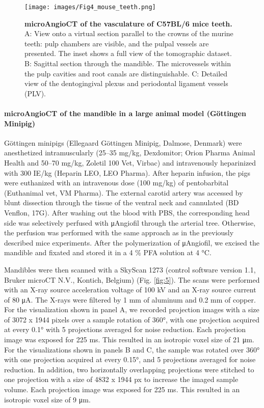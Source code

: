 \begin{figure}
\hypertarget{fig:4}{%
\centering
\texttt{[image: images/Fig4\_mouse\_teeth.png]}
\caption{\textbf{microAngioCT of the vasculature of C57BL/6 mice teeth.}
A: View onto a virtual section parallel to the crowns of the murine teeth: pulp chambers are visible, and the pulpal vessels are presented.
The inset shows a full view of the tomographic dataset.
B: Sagittal section through the mandible.
The microvessels within the pulp cavities and root canals are distinguishable.
C: Detailed view of the dentogingival plexus and periodontal ligament vessels (PLV).}\label{fig:4}
}
\end{figure}

\hypertarget{microangioct-of-the-mandible-in-a-large-animal-model-guxf6ttingen-minipig}{%
\paragraph{microAngioCT of the mandible in a large animal model (Göttingen Minipig)}\label{microangioct-of-the-mandible-in-a-large-animal-model-guxf6ttingen-minipig}}

Göttingen minipigs (Ellegaard Göttingen Minipig, Dalmose, Denmark) were anesthetized intramuscularly (25--35 mg/kg, Dexdomitor; Orion Pharma Animal Health and 50--70 mg/kg, Zoletil 100 Vet, Virbac) and intravenously heparinized with 300 IE/kg (Heparin LEO, LEO Pharma).
After heparin infusion, the pigs were euthanized with an intravenous dose (100 mg/kg) of pentobarbital (Euthanimal vet, VM Pharma).
The external carotid artery was accessed by blunt dissection through the tissue of the ventral neck and cannulated (BD Venflon, 17G).
After washing out the blood with PBS, the corresponding head side was selectively perfused with μAngiofil through the arterial tree.
Otherwise, the perfusion was performed with the same approach as in the previously described mice experiments.
After the polymerization of μAngiofil, we excised the mandible and fixated and stored it in a 4 \% PFA solution at 4 °C.

Mandibles were then scanned with a SkyScan 1273 (control software version 1.1, Bruker microCT N.V., Kontich, Belgium) (Fig. \ref{fig:5}).
The scans were performed with an X-ray source acceleration voltage of 100 kV and an X-ray source current of 80 μA.
The X-rays were filtered by 1 mm of aluminum and 0.2 mm of copper.
For the visualization shown in panel A, we recorded projection images with a size of 3072 x 1944 pixels over a sample rotation of 360°, with one projection acquired at every 0.1° with 5 projections averaged for noise reduction.
Each projection image was exposed for 225 ms.
This resulted in an isotropic voxel size of 21 μm.
For the visualizations shown in panels B and C, the sample was rotated over 360° with one projection acquired at every 0.15°, and 5 projections averaged for noise reduction.
In addition, two horizontally overlapping projections were stitched to one projection with a size of 4832 x 1944 px to increase the imaged sample volume.
Each projection image was exposed for 225 ms.
This resulted in an isotropic voxel size of 9 μm.

